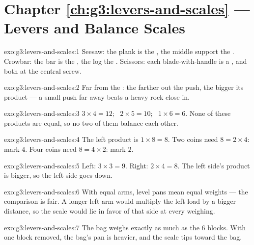 \section*{Chapter \ref{ch:g3:levers-and-scales} --- Levers and Balance Scales}

\begin{solution}{exo:g3:levers-and-scales:1}
Seesaw: the plank is the , the middle support the .
Crowbar: the bar is the , the log the . Scissors: each
blade-with-handle is a , and both  at the central screw.
\end{solution}

\begin{solution}{exo:g3:levers-and-scales:2}
Far from the : the farther out the push, the bigger its product
--- a small push far away beats a heavy rock close in.
\end{solution}

\begin{solution}{exo:g3:levers-and-scales:3}
$3 \times 4 = 12$; \ $2 \times 5 = 10$; \ $1 \times 6 = 6$. None of
these products are equal, so no two of them balance each other.
\end{solution}

\begin{solution}{exo:g3:levers-and-scales:4}
The left product is $1 \times 8 = 8$. Two coins need $8 = 2 \times
4$: mark $4$. Four coins need $8 = 4 \times 2$: mark $2$.
\end{solution}

\begin{solution}{exo:g3:levers-and-scales:5}
Left: $3 \times 3 = 9$. Right: $2 \times 4 = 8$. The left side's
product is bigger, so the left side goes down.
\end{solution}

\begin{solution}{exo:g3:levers-and-scales:6}
With equal arms, level pans mean equal weights --- the comparison is
fair. A longer left arm would multiply the left load by a bigger
distance, so the scale would lie in favor of that side at every
weighing.
\end{solution}

\begin{solution}{exo:g3:levers-and-scales:7}
The bag weighs exactly as much as the $6$ blocks. With one block
removed, the bag's pan is heavier, and the scale tips toward the
bag.
\end{solution}

